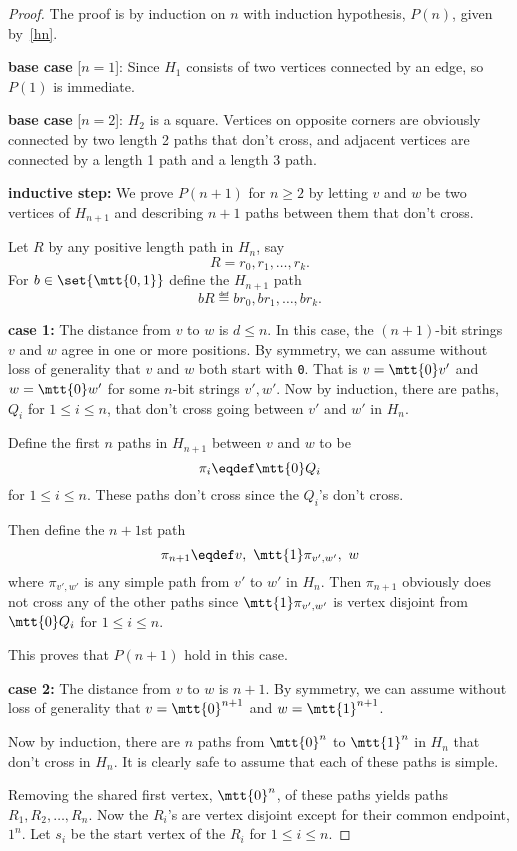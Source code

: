 \begin{problem}
\begin{solution}
\begin{proof}
The proof is by induction on $n$ with induction hypothesis,
  $P(n)$, given by~\eqref{hn}.

\textbf{base case} [$n=1$]: Since $H_1$ consists of two
vertices connected by an edge, so $P(1)$ is immediate.

\textbf{base case} [$n=2$]: $H_2$ is a square.  Vertices on opposite
corners are obviously connected by two length 2 paths that don't cross, and
adjacent vertices are connected by a length 1 path and a length 3 path.

\textbf{inductive step:} We prove $P(n+1)$ for $n \geq 2$ by letting $v$
and $w$ be two vertices of $H_{n+1}$ and describing $n+1$ paths between them
that don't cross.

Let $R$ by any positive length path in $H_n$, say
\[
R = r_0,r_1,\dots, r_k.
\]
For $b \in \set{\mtt{0,1}}$ define the $H_{n+1}$ path
\[
bR \eqdef br_0, br_1,  \dots, br_k.
\]

\textbf{case 1:} The distance from $v$ to $w$ is $d \leq n$.  In this
case, the $(n+1)$-bit strings $v$ and $w$ agree in one or more positions.
By symmetry, we can assume without loss of generality that $v$ and $w$
both start with \texttt{0}.  That is $v=\mtt{0}v'$ and $w=\mtt{0}w'$ for
some $n$-bit strings $v', w'$.  Now by induction, there are paths, $Q_i$
for $1 \leq i \leq n$, that don't cross going between $v'$ and $w'$ in
$H_n$.

Define the first $n$ paths in $H_{n+1}$ between $v$ and $w$ to be
\[
\pi_i \eqdef \mtt{0}Q_i
\]
for $1 \leq i \leq n$.  These paths don't cross since the $Q_i$'s don't
cross.

Then define the $n+1$st path
\[
\pi_{n+1} \eqdef v,\ \mtt{1}\pi_{v',w'},\ w
\]
where $\pi_{v',w'}$ is any simple path from $v'$ to $w'$ in $H_n$.
Then $\pi_{n+1}$ obviously does not cross any of the other paths since
$\mtt{1}\pi_{v',w'}$ is vertex disjoint from $\mtt{0}Q_i$ for $1 \leq i \leq n$.

This proves that $P(n+1)$ hold in this case.

\textbf{case 2:} The distance from $v$ to $w$ is $n+1$.  By symmetry, we
can assume without loss of generality that $v=\mtt{0}^{n+1}$ and
$w=\mtt{1}^{n+1}$.

Now by induction, there are $n$ paths from $\mtt{0}^n$ to $\mtt{1}^n$ in
$H_n$ that don't cross in $H_n$.  It is clearly safe to assume that each
of these paths is simple.

Removing the shared first vertex, $\mtt{0}^n$, of these paths yields paths
$R_1,R_2,\dots,R_n$.  Now the $R_i$'s are vertex disjoint except for their
common endpoint, $1^n$.  Let $s_i$ be the start vertex of the $R_i$ for $1
\leq i \leq n$.


\end{proof}
\end{solution}
\end{problem}
